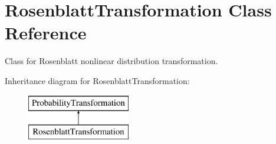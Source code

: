 \section{Rosenblatt\+Transformation Class Reference}
\label{classPecos_1_1RosenblattTransformation}


Class for Rosenblatt nonlinear distribution transformation.  


Inheritance diagram for Rosenblatt\+Transformation\+:\begin{figure}[H]
\begin{center}
\leavevmode
\includegraphics[height=2.000000cm]{classPecos_1_1RosenblattTransformation}
\end{center}
\end{figure}
